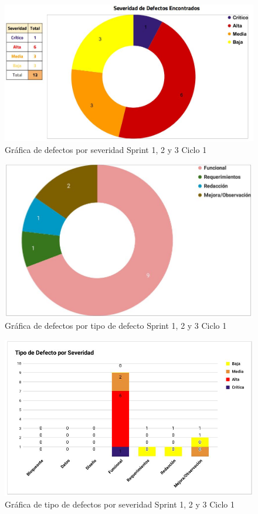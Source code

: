 \newpage

\begin{figure}[H]
	\begin{center}
		\includegraphics[width=.85\textwidth]{images/pruebas/s1c1-1}
		\caption{Gráfica de defectos por severidad Sprint 1, 2 y 3 Ciclo 1}
		\label{fig:infos1c1-1}
	\end{center}
\end{figure}

\begin{figure}[H]
	\begin{center}
		\includegraphics[width=.75\textwidth]{images/pruebas/s1c1-2}
		\caption{Gráfica de defectos por tipo de defecto Sprint 1, 2 y 3 Ciclo 1}
		\label{fig:infos1c1-2}
	\end{center}
\end{figure}

\newpage

\begin{figure}[H]
	\begin{center}
		\includegraphics[width=.95\textwidth]{images/pruebas/s1c1-3}
		\caption{Gráfica de tipo de defectos por severidad Sprint 1, 2 y 3 Ciclo 1}
		\label{fig:infos1c1-3}
	\end{center}
\end{figure}

